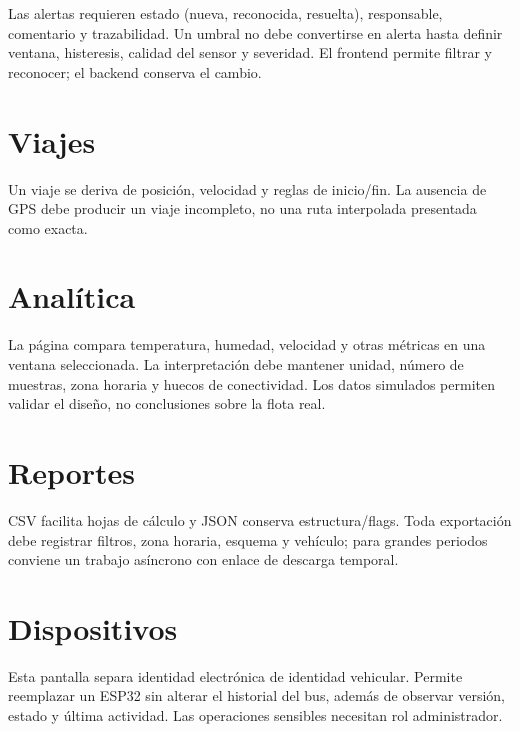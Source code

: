 \documentclass[11pt,a4paper,oneside]{report}
\begin{document}
Las alertas requieren estado (nueva, reconocida, resuelta), responsable, comentario y
trazabilidad. Un umbral no debe convertirse en alerta hasta definir ventana,
histeresis, calidad del sensor y severidad. El frontend permite filtrar y reconocer;
el backend conserva el cambio.

\section{Viajes}

Un viaje se deriva de posición, velocidad y reglas de inicio/fin. La ausencia de GPS
debe producir un viaje incompleto, no una ruta interpolada presentada como exacta.

\section{Analítica}

La página compara temperatura, humedad, velocidad y otras métricas en una ventana
seleccionada. La interpretación debe mantener unidad, número de muestras, zona horaria
y huecos de conectividad. Los datos simulados permiten validar el diseño, no conclusiones
sobre la flota real.

\section{Reportes}

CSV facilita hojas de cálculo y JSON conserva estructura/flags. Toda exportación debe
registrar filtros, zona horaria, esquema y vehículo; para grandes periodos conviene un
trabajo asíncrono con enlace de descarga temporal.

\section{Dispositivos}

Esta pantalla separa identidad electrónica de identidad vehicular. Permite reemplazar
un ESP32 sin alterar el historial del bus, además de observar versión, estado y última
actividad. Las operaciones sensibles necesitan rol administrador.
\end{document}
